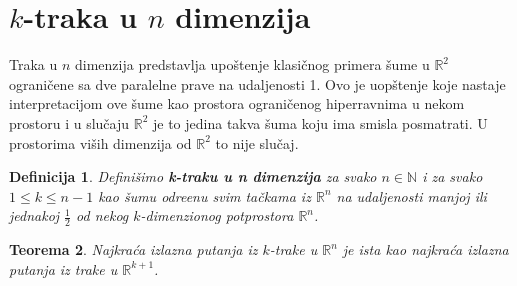 \documentclass[11pt,letter]{article}
\newtheorem{teo}{\bf Teorema}[section]
\newtheorem{df}[teo]{\bf Definicija}
\begin{document}
\section[$k$-traka u $n$ dimenzija]{$k$-traka u $n$ dimenzija}
\bigskip
\indent Traka u $n$ dimenzija predstavlja upo\v stenje klasi\v cnog primera \v sume u $\mathbb{R}^2$ ograni\v cene sa dve paralelne prave na udaljenosti 1. Ovo je uop\v stenje koje nastaje interpretacijom ove \v sume kao prostora ograni\v cenog hiperravnima u nekom prostoru i u slu\v caju $\mathbb{R}^2$ je to jedina takva \v suma koju ima smisla posmatrati. U prostorima vi\v sih dimenzija od $\mathbb{R}^2$ to nije slu\v caj.
\\
\begin{df} Defini\v simo \textbf{k-traku u n dimenzija} za svako $n\in \mathbb{N}$ i za svako $1\leqslant k\leqslant n-1$  kao \v sumu odre\dj enu svim ta\v ckama iz $\mathbb{R}^n$ na udaljenosti manjoj ili jednakoj $\frac{1}{2}$ od nekog $k$-dimenzionog potprostora $\mathbb{R}^n$. 
\end{df}
\begin{teo} Najkra\' ca izlazna putanja iz $k$-trake u $\mathbb{R}^n$ je ista kao najkra\' ca izlazna putanja iz trake u $\mathbb{R}^{k+1}$.\end{teo}
\end{document}
